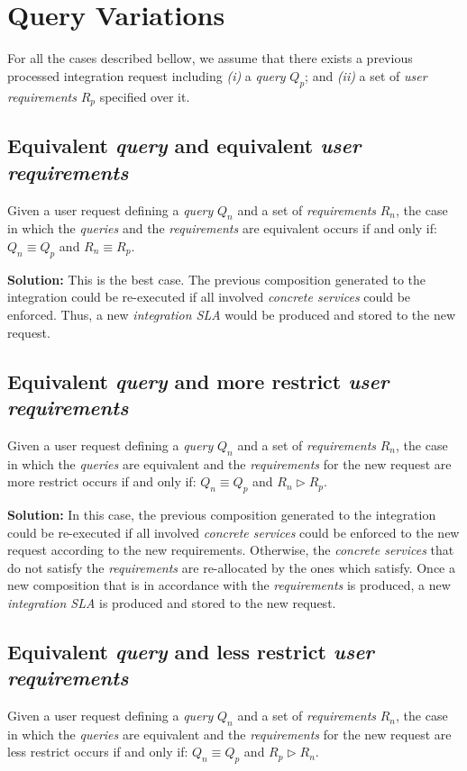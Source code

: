 \section{Query Variations}

For all the cases described bellow, we assume that there exists a previous processed integration request including \textit{(i)} a \textsl{query} $Q_{p}$; and \textit{(ii)} a set of \textsl{user requirements} $R_{p}$ specified over it.

\subsection{Equivalent \textsl{query} and equivalent \textsl{user requirements}}
Given a user request defining a \textsl{query} $Q_{n}$ and a set of \textsl{requirements} $R_{n}$, the case in which the \textsl{queries} and the \textsl{requirements} are equivalent occurs if and only if: $Q_{n} \equiv Q_{p}$ and $R_{n} \equiv R_{p}$.

\bigskip
\noindent \textbf{Solution:} This is the best case. The previous composition generated to the integration could be re-executed if all involved \textsl{concrete services} could be enforced. Thus, a new \textsl{integration SLA} would be produced and stored to the new request.

\subsection{Equivalent \textsl{query} and more restrict \textsl{user requirements}}
Given a user request defining a \textsl{query} $Q_{n}$ and a set of \textsl{requirements} $R_{n}$, the case in which the \textsl{queries} are equivalent and the \textsl{requirements} for the new request are more restrict occurs if and only if: $Q_{n} \equiv Q_{p}$ and $R_{n} \triangleright R_{p}$.

\bigskip
\noindent \textbf{Solution:} In this case,  the previous composition generated to the integration could be re-executed if all involved \textsl{concrete services} could be enforced to the new request according to the new requirements. Otherwise, the \textsl{concrete services} that do not satisfy the \textsl{requirements} are re-allocated by the ones which satisfy. Once a new composition that is in accordance with the \textsl{requirements} is produced, a new \textsl{integration SLA} is produced and stored to the new request.

\subsection{Equivalent \textsl{query} and less restrict \textsl{user requirements}}
Given a user request defining a \textsl{query} $Q_{n}$ and a set of \textsl{requirements} $R_{n}$, the case in which the \textsl{queries} are equivalent and the \textsl{requirements} for the new request are less restrict occurs if and only if: $Q_{n} \equiv Q_{p}$ and $R_{p} \triangleright R_{n}$.

